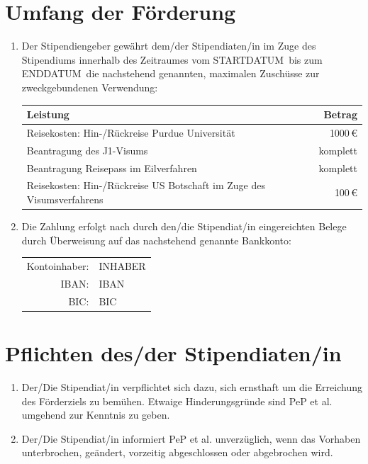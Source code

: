 \documentclass[
  paper=a4,
  fontsize=12pt,
  DIV=16,
  parskip=full,
  headinclude=true,
]{scrartcl}
\newcommand\stipstart{STARTDATUM} %
\newcommand\stipende{ENDDATUM}    %
\newcommand\stipkontoinhaber{INHABER}    %
\newcommand\stipbic{BIC}          %
\newcommand\stipiban{IBAN}
\begin{document}
\section{Umfang der Förderung}

\begin{enumerate}[\qquad(1)]
  \item Der Stipendiengeber gewährt dem/der Stipendiaten/in im Zuge des
    Stipendiums innerhalb des Zeitraumes vom \stipstart\ bis zum \stipende\
    die nachstehend genannten, maximalen Zuschüsse zur zweckgebundenen Verwendung:

    \begin{tabular}{l r}
      \toprule
      Leistung & Betrag \\
      \midrule
      Reisekosten: Hin-/Rückreise Purdue Universität & \num{1000}\,€ \\
      Beantragung des J1-Visums & komplett \\
      Beantragung Reisepass im Eilverfahren & komplett \\
      Reisekosten: Hin-/Rückreise US Botschaft im Zuge des Visumsverfahrens &
        \num{100}\,€ \\
      \bottomrule
    \end{tabular}
  \item Die Zahlung erfolgt nach durch den/die Stipendiat/in eingereichten
    Belege durch Überweisung auf das nachstehend genannte Bankkonto:

    \begin{tabular}{rl}
      Kontoinhaber: & \stipkontoinhaber \\
      IBAN: & \stipiban \\
      BIC: & \stipbic \\
    \end{tabular}
\end{enumerate}

\section{Pflichten des/der Stipendiaten/in}

\begin{enumerate}[\qquad(1)]
  \item Der/Die Stipendiat/in verpflichtet sich dazu, sich ernsthaft um die
    Erreichung des Förderziels zu bemühen. Etwaige Hinderungsgründe sind
    PeP et al. umgehend zur Kenntnis zu geben.
  \item Der/Die Stipendiat/in informiert PeP et al. unverzüglich, wenn das
    Vorhaben unterbrochen, geändert, vorzeitig abgeschlossen oder
    abgebrochen wird.
\end{enumerate}
\end{document}

